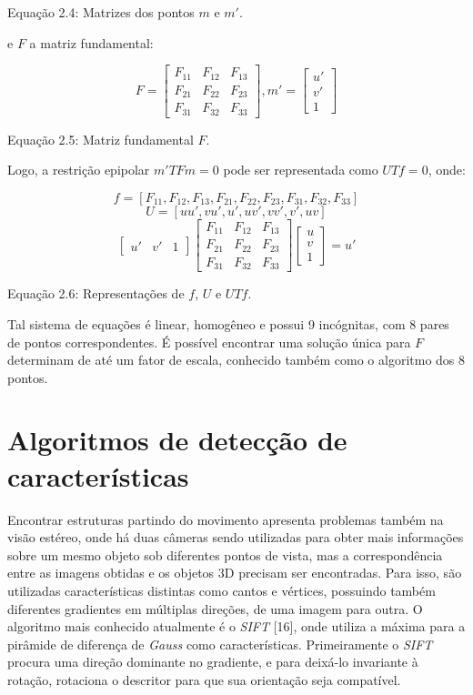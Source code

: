Equação 2.4: Matrizes dos pontos $m$ e $m'$.

e $F$ a matriz fundamental:

$$
F = 
\begin{bmatrix}
	F_{11} &  F_{12} &  F_{13}\\
	F_{21} &  F_{22} &  F_{23}\\
	F_{31} &  F_{32} &  F_{33}
\end{bmatrix}, m' = \begin{bmatrix}u'\\v'\\1\end{bmatrix}
$$

Equação 2.5: Matriz fundamental $F$.

Logo, a restrição epipolar $m'TFm = 0$ pode ser representada como $UTf = 0$, onde:

$$
f = [F_{11}, F_{12}, F_{13}, F_{21}, F_{22}, F_{23}, F_{31}, F_{32}, F_{33}]
$$
$$
U = [uu', vu', u', uv', vv', v', uv]
$$
$$
\begin{bmatrix}u' & v' & 1\end{bmatrix} 
\begin{bmatrix}
	F_{11} &  F_{12} &  F_{13}\\
	F_{21} &  F_{22} &  F_{23}\\
	F_{31} &  F_{32} &  F_{33}
\end{bmatrix}
\begin{bmatrix}u\\v\\1\end{bmatrix} = u'
$$

Equação 2.6: Representações de $f$, $U$ e $UTf$.

Tal sistema de equações é linear, homogêneo e possui 9 incógnitas, com 8 pares de pontos correspondentes. É possível encontrar uma solução única para $F$ determinam de até um fator de escala, conhecido também como o algoritmo dos 8 pontos.


\section{Algoritmos de detecção de características}

Encontrar estruturas partindo do movimento apresenta problemas também na visão estéreo, onde há duas câmeras sendo utilizadas para obter mais informações sobre um mesmo objeto sob diferentes pontos de vista, mas a correspondência entre as imagens obtidas e os objetos 3D precisam ser encontradas. Para isso, são utilizadas características distintas como cantos e vértices, possuindo também diferentes gradientes em múltiplas direções, de uma imagem para outra. O algoritmo mais conhecido atualmente é o \textit{SIFT} [16], onde utiliza a máxima para a pirâmide de diferença de \textit{Gauss} como características. Primeiramente o \textit{SIFT} procura uma direção dominante no gradiente, e para deixá-lo invariante à rotação, rotaciona o descritor para que sua orientação seja compatível.

